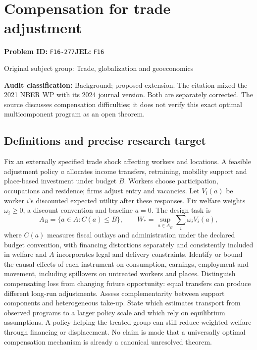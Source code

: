 \documentclass[11pt,a4paper]{article}
\begin{document}
\section*{Compensation for trade adjustment}
\textbf{Problem ID:} \texttt{F16-277}\quad \textbf{JEL:} \texttt{F16}\par
\label{problem:OP-0341}
{\sffamily\small\color{muted}Original subject group: Trade, globalization and geoeconomics\par}
\label{definitions:problem:30007623}
\textbf{Audit classification:} Background; proposed extension. The citation mixed the 2021 NBER WP with its 2024 journal version. Both are separately corrected. The source discusses compensation difficulties; it does not verify this exact optimal multicomponent program as an open theorem.
\subsection*{Definitions and precise research target}
Fix an externally specified trade shock affecting workers and locations. A feasible adjustment policy \(a\) allocates income transfers, retraining, mobility support and place-based investment under budget \(B\). Workers choose participation, occupations and residence; firms adjust entry and vacancies. Let \(V_i(a)\) be worker \(i\)'s discounted expected utility after these responses. Fix welfare weights \(\omega_i\geq0\), a discount convention and baseline \(a=0\). The design task is
\[A_B=\{a\in A:C(a)\leq B\},\qquad W_*=\sup_{a\in A_B}\sum_i\omega_iV_i(a),\]
where \(C(a)\) measures fiscal outlays and administration under the declared budget convention, with financing distortions separately and consistently included in welfare and \(A\) incorporates legal and delivery constraints. Identify or bound the causal effects of each instrument on consumption, earnings, employment and movement, including spillovers on untreated workers and places. Distinguish compensating loss from changing future opportunity: equal transfers can produce different long-run adjustments. Assess complementarity between support components and heterogeneous take-up. State which estimates transport from observed programs to a larger policy scale and which rely on equilibrium assumptions. A policy helping the treated group can still reduce weighted welfare through financing or displacement. No claim is made that a universally optimal compensation mechanism is already a canonical unresolved theorem.
\end{document}
